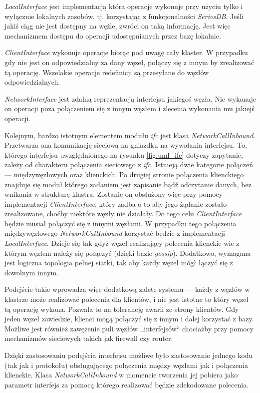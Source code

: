 \documentclass[a4paper,polish,12pt,twoside]{article}
\begin{document}
\textit{LocalInterface} jest implementacją która operacje wykonuje przy użyciu tylko i wyłącznie lokalnych zasobów, tj. korzystając z funkcjonalności \textit{SeriesDB}. Jeśli jakiś ciąg nie jest dostępny na węźle, zwróci on taką informację. Jest więc mechanizmem dostępu do operacji udostępnianych przez bazę lokalnie.

\textit{ClientInterface} wykonuje operacje biorąc pod uwagę cały klaster. W przypadku gdy nie jest on odpowiedzialny za dany węzeł, połączy się z innym by zrealizować tą operację. Wszelakie operacje redefinicji są przesyłane do węzłów odpowiedzialnych.

\textit{NetworkInterface} jest zdalną reprezentacją interfejsu jakiegoś węzła. Nie wykonuje on operacji poza połączeniem się z innym węzłem i zlecenia wykonania mu jakiejś operacji.

Kolejnym, bardzo istotnym elementem modułu \textit{ifc} jest klasa \textit{NetworkCallInbound}. Przetwarza ona komunikację sieciową na gniazdku na wywołania interfejsu. To, którego interfejsu uwzględnionego na rysunku \ref{fig:uml_ifc} dotyczy zapytanie, zależy od charakteru połączenia sieciowego z \textit{ifc}. Istnieją dwie kategorie połączeń --- międzywęzłowych oraz klienckich. Po drugiej stronie połączenia klienckiego znajduje się moduł którego zadaniem jest zapisanie bądź odczytanie danych, bez wnikania w strukturę klastra. Zostanie on obsłużony więc przy pomocy implementacji \textit{ClientInterface}, który zadba o to aby jego żądanie zostało zrealizowane, choćby niektóre węzły nie działały. Do tego celu \textit{ClientInterface} będzie musiał połączyć się z innymi węzłami. W przypadku tego połączenia międzywęzłowego \textit{NetworkCallInbound} korzystać będzie z implementacji \textit{LocalInterface}. Dzieje się tak gdyż węzeł realizujący polecenia klienckie wie z którym węzłem należy się połączyć (dzięki bazie \textit{gossip}). Dodatkowo, wymagana jest logiczna topologia pełnej siatki, tak aby każdy węzeł mógł łączyć się z dowolnym innym.

Podejście takie wprowadza więc dodatkową zaletę systemu --- każdy z węzłów w klastrze może realizować polecenia dla klientów, i nie jest istotne to który węzeł tą operację wykona. Pozwala to na tolerancję awarii ze strony klientów. Gdy jeden węzeł zawiedzie, klienci mogą połączyć się z innym i dalej korzystać z bazy. Możliwe jest również zawężenie puli węzłów ,,interfejsów`` chociażby przy pomocy mechanizmów sieciowych takich jak firewall czy router. 

Dzięki zastosowaniu podejścia interfejsu możliwe było zastosowanie jednego kodu (tak jak i protokołu) obsługującego połączenia między węzłami jak i połączenia klienckie. Klasa \textit{NetworkCallInbound} w momencie tworzenia jej pobiera jako parametr interfejs za pomocą którego realizować będzie zdekodowane polecenia.
\end{document}
